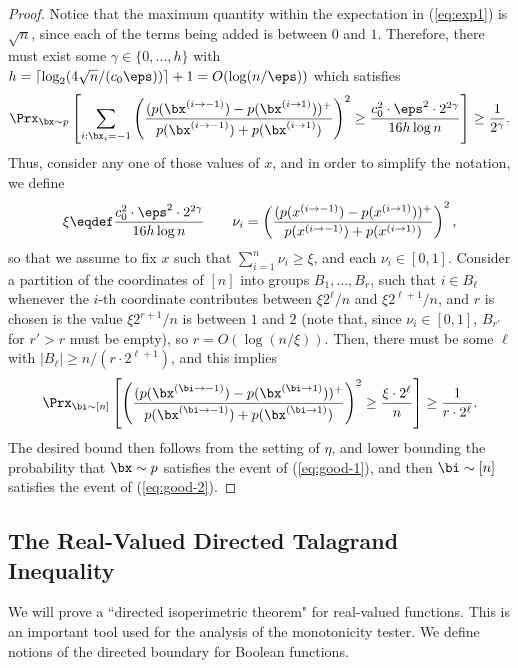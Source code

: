 \begin{proof}
    Notice that the maximum quantity within the expectation in (\ref{eq:exp1}) is $\sqrt{n}$, since each of the terms being added is between $0$ and $1$. Therefore, there must exist some $\gamma \in \{0,\dots, h \}$ with $h = \lceil \log_2(4\sqrt{n}/(c_0\eps))\rceil + 1 = O(\log(n/\eps))$ which satisfies
    \begin{align}
     \Prx_{\bx \sim p}\left[\sum_{i:\bx_i=-1} \left(\dfrac{(p(\bx^{(i\to-1)}) - p(\bx^{(i\to1)}))^+}{p(\bx^{(i\to-1)}) + p(\bx^{(i\to1)})} \right)^2 \geq \frac{c_0^2 \cdot \eps^2 \cdot 2^{2\gamma}}{16h\log n} \right] \geq \frac{1}{2^{\gamma}}. \label{eq:good-1}
    \end{align}
    Thus, consider any one of those values of $x$, and in order to simplify the notation, we define 
    \[ \xi \eqdef \frac{c_0^2 \cdot \eps^2 \cdot  2^{2\gamma}}{16h\log n} \qquad \nu_i = \left(\dfrac{(p(x^{(i\to-1)}) - p(x^{(i\to1)}))^+}{p(x^{(i\to-1)}) + p(x^{(i\to1)})} \right)^2,\]
    so that we assume to fix $x$ such that $\sum_{i=1}^n \nu_i \geq \xi$, and each $\nu_i \in [0, 1]$. Consider a partition of the coordinates of $[n]$ into groups $B_1, \dots, B_{r}$, such that $i \in B_{\ell}$ whenever the $i$-th coordinate contributes between $\xi 2^{\ell}/ n$ and $\xi 2^{\ell+1} / n$, and $r$ is chosen is the value $\xi 2^{r+1} / n$ is between $1$ and $2$ (note that, since $\nu_i \in [0, 1]$, $B_{r'}$ for $r' > r$ must be empty), so $r = O(\log(n/\xi))$. Then, there must be some $\ell$ with $|B_{\ell}| \geq n / (r \cdot 2^{\ell+1})$, and this implies
    \begin{align}
        \Prx_{\bi \sim [n]}\left[\left(\dfrac{(p(\bx^{(\bi\to-1)}) - p(\bx^{(\bi\to1)}))^+}{p(\bx^{(\bi\to-1)}) + p(\bx^{(\bi\to1)})} \right)^2 \geq \frac{\xi \cdot 2^{\ell}}{n}  \right] \geq \frac{1}{r \cdot 2^{\ell}}.\label{eq:good-2}
    \end{align}
    The desired bound then follows from the setting of $\eta$, and lower bounding the probability that $\bx \sim p$ satisfies the event of (\ref{eq:good-1}), and then $\bi \sim [n]$ satisfies the event of (\ref{eq:good-2}).
\end{proof}

\subsection{The Real-Valued Directed Talagrand Inequality} \label{sec:tal}

We will prove a ``directed isoperimetric theorem" for real-valued functions. This is an important
tool used for the analysis of the monotonicity tester. We define notions of the
directed boundary for Boolean functions. 

